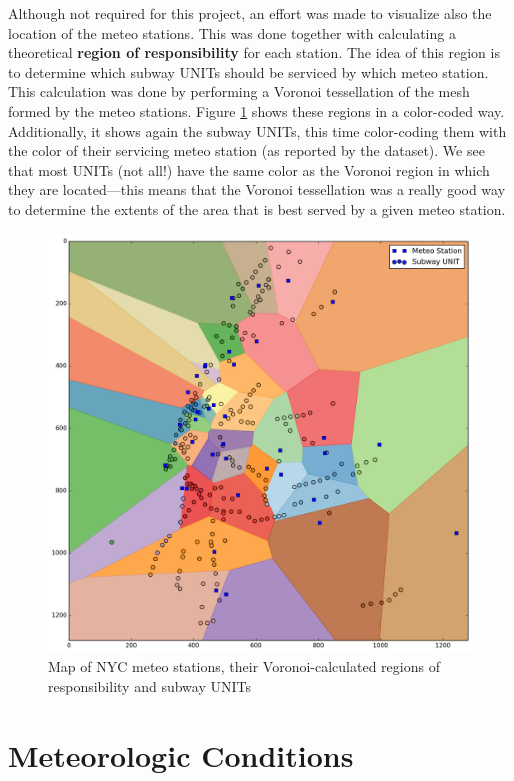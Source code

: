 \documentclass{article}
\begin{document}
Although not required for this project, an effort was made to visualize also the location of the meteo stations. This was done together with calculating a theoretical \textbf{region of responsibility} for each station. The idea of this region is to determine which subway UNITs should be serviced by which meteo station. This calculation was done by performing a Voronoi tessellation of the mesh formed by the meteo stations. Figure \ref{fig:meteo_voronoi} shows these regions in a color-coded way. Additionally, it shows again the subway UNITs, this time color-coding them with the color of their servicing meteo station (as reported by the dataset). We see that most UNITs (not all!) have the same color as the Voronoi region in which they are located---this means that the Voronoi tessellation was a really good way to determine the extents of the area that is best served by a given meteo station. 

\begin{figure}[ht]
\centering
\includegraphics[width=\textwidth]{meteo_voronoi.png}
\caption{Map of NYC meteo stations, their Voronoi-calculated regions of responsibility and subway UNITs}
\label{fig:meteo_voronoi}
\end{figure}

\section{Meteorologic Conditions}
\end{document}
